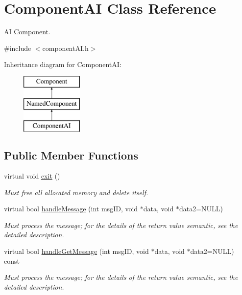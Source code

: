 \hypertarget{classComponentAI}{
\section{\-Component\-A\-I \-Class \-Reference}
\label{da/d09/classComponentAI}
}


\-A\-I \hyperlink{classComponent}{\-Component}.  




{\ttfamily \#include $<$component\-A\-I.\-h$>$}

\-Inheritance diagram for \-Component\-A\-I\-:\begin{figure}[H]
\begin{center}
\leavevmode
\includegraphics[height=3.000000cm]{da/d09/classComponentAI}
\end{center}
\end{figure}
\subsection*{\-Public \-Member \-Functions}
\begin{DoxyCompactItemize}
\item 
\hypertarget{classComponentAI_acd4637106cad4777efd6870b22c0673e}{
virtual void \hyperlink{classComponentAI_acd4637106cad4777efd6870b22c0673e}{exit} ()}
\label{da/d09/classComponentAI_acd4637106cad4777efd6870b22c0673e}

\begin{DoxyCompactList}\small\item\em \-Must free all allocated memory and delete itself. \end{DoxyCompactList}\item 
virtual bool \hyperlink{classComponentAI_a923f3644961af176d3c6e3d316185272}{handle\-Message} (int msg\-I\-D, void $\ast$data, void $\ast$data2=\-N\-U\-L\-L)
\begin{DoxyCompactList}\small\item\em \-Must process the message; for the details of the return value semantic, see the detailed description. \end{DoxyCompactList}\item 
virtual bool \hyperlink{classComponentAI_a0d7b0390215d032d1388843458a5211e}{handle\-Get\-Message} (int msg\-I\-D, void $\ast$data, void $\ast$data2=\-N\-U\-L\-L) const 
\begin{DoxyCompactList}\small\item\em \-Must process the message; for the details of the return value semantic, see the detailed description. \end{DoxyCompactList}\end{DoxyCompactItemize}
